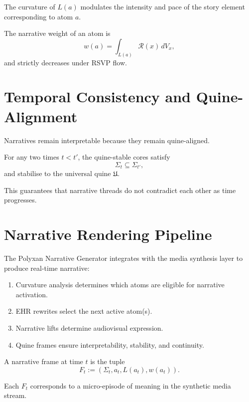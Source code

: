 The curvature of $L(a)$ modulates the intensity and pace of the story element
corresponding to atom $a$.

\begin{theorem}
The narrative weight of an atom is
\[
w(a) = \int_{L(a)} \mathcal{R}(x) \, dV_x,
\]
and strictly decreases under RSVP flow.
\end{theorem}


\section{Temporal Consistency and Quine-Alignment}
\label{sec:54:temporal-consistency}

Narratives remain interpretable because they remain quine-aligned.

\begin{theorem}
For any two times $t < t'$, the quine-stable cores satisfy
\[
\Sigma_t \subseteq \Sigma_{t'},
\]
and stabilise to the universal quine $\mathfrak{U}$.
\end{theorem}

This guarantees that narrative threads do not contradict each other as time
progresses.


\section{Narrative Rendering Pipeline}
\label{sec:54:rendering}

The Polyxan Narrative Generator integrates with the media synthesis layer to
produce real-time narrative:

\begin{enumerate}
  \item Curvature analysis determines which atoms are eligible for narrative
        activation.
  \item EHR rewrites select the next active atom(s).
  \item Narrative lifts determine audiovisual expression.
  \item Quine frames ensure interpretability, stability, and continuity.
\end{enumerate}

\begin{definition}
A narrative frame at time $t$ is the tuple
\[
F_t := (\Sigma_t, a_t, L(a_t), w(a_t)).
\]
\end{definition}

Each $F_t$ corresponds to a micro-episode of meaning in the synthetic media
stream.


